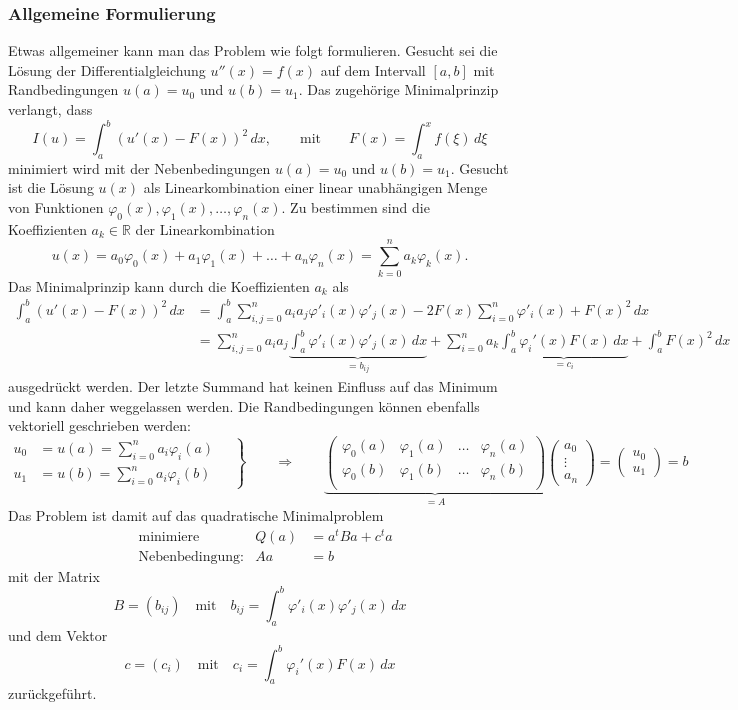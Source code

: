 \subsubsection{Allgemeine Formulierung}
Etwas allgemeiner kann man das Problem wie folgt formulieren.
Gesucht sei die Lösung der Differentialgleichung $u''(x)=f(x)$ auf
dem Intervall $[a,b]$ mit Randbedingungen $u(a)=u_0$ und $u(b)=u_1$.
Das zugehörige Minimalprinzip verlangt, dass
\[
I(u) = \int_a^b (u'(x) - F(x))^2\,dx,
\qquad \text{mit}\qquad F(x) = \int_a^x f(\xi)\,d\xi
\]
minimiert wird mit der Nebenbedingungen $u(a)=u_0$ und $u(b)=u_1$.
Gesucht ist die Lösung $u(x)$ als Linearkombination einer linear
unabhängigen Menge von Funktionen
$\varphi_0(x),\varphi_1(x),\dots,\varphi_n(x)$.
Zu bestimmen sind die Koeffizienten $a_k\in\mathbb R$ der Linearkombination
\[
u(x) = a_0\varphi_0(x) + a_1\varphi_1(x) + \dots + a_n\varphi_n(x)
=
\sum_{k=0}^n a_k\varphi_k(x).
\]
Das Minimalprinzip kann durch die Koeffizienten $a_k$ als
\begin{align*}
\int_a^b (u'(x)-F(x))^2 \,dx
&=
\int_a^b 
\sum_{i,j=0}^n
a_ia_j
\varphi'_i(x)\varphi'_j(x) 
-2F(x)
\sum_{i=0}^n \varphi'_i(x)
+
F(x)^2
\,dx
\\
&=
\sum_{i,j=0}^n a_ia_j
\underbrace{\int_a^b \varphi'_i(x)\varphi'_j(x)\,dx}_{\displaystyle=b_{ij}}
+
\sum_{i=0}^n a_k \underbrace{\int_a^b \varphi_i'(x)F(x)\,dx }_{\displaystyle=c_i}
+
\int_a^b F(x)^2\,dx
\end{align*}
ausgedrückt werden.
Der letzte Summand hat keinen Einfluss auf das Minimum und kann daher
weggelassen werden.
Die Randbedingungen können ebenfalls vektoriell geschrieben werden:
\[
\left.
\begin{aligned}
u_0&=u(a) = \sum_{i=0}^n a_i\varphi_i(a) \\
u_1&=u(b) = \sum_{i=0}^n a_i\varphi_i(b)
\end{aligned}
\quad
\right\}
\qquad\Rightarrow\qquad
\underbrace{\begin{pmatrix}
\varphi_0(a)& \varphi_1(a) & \dots & \varphi_n(a) \\
\varphi_0(b)& \varphi_1(b) & \dots & \varphi_n(b) \\
\end{pmatrix}}_{\displaystyle =A}
\begin{pmatrix}a_0\\\vdots\\a_n\end{pmatrix}
=
\begin{pmatrix}
u_0\\u_1
\end{pmatrix} = b
\]
Das Problem ist damit auf das quadratische Minimalproblem
\[
\begin{aligned}
&\text{minimiere}&
Q(a) &= a^tBa + c^ta 
\\
&\text{Nebenbedingung:}&
Aa&=b
\end{aligned}
\]
mit der Matrix
\[
B=(b_{ij})
\quad\text{mit}\quad
b_{ij}
= 
\int_a^b \varphi'_i(x)\varphi'_j(x)\,dx
\]
und dem Vektor
\[
c=(c_i)
\quad
\text{mit}\quad
c_i
=
\int_a^b \varphi_i'(x) F(x)\,dx
\]
zurückgeführt.

